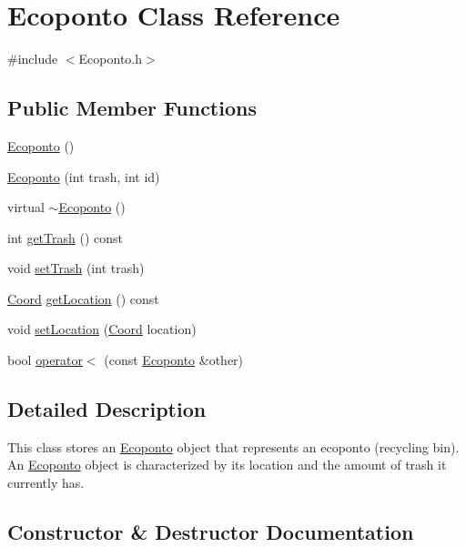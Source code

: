 \hypertarget{class_ecoponto}{}\section{Ecoponto Class Reference}
\label{class_ecoponto}


{\ttfamily \#include $<$Ecoponto.\+h$>$}

\subsection*{Public Member Functions}
\begin{DoxyCompactItemize}
\item 
\hyperlink{class_ecoponto_a77182257dfc416589972bd4207142f6b}{Ecoponto} ()
\item 
\hyperlink{class_ecoponto_aa22ed326556db71e993a171c420c4dc0}{Ecoponto} (int trash, int id)
\item 
virtual \hyperlink{class_ecoponto_ab55000fee9f2189ed648571d0760df87}{$\sim$\+Ecoponto} ()
\item 
int \hyperlink{class_ecoponto_a55135a0a993421f2b52379b86379dfe8}{get\+Trash} () const 
\item 
void \hyperlink{class_ecoponto_a6393c63f3bcd980e259c16c2a89b4b91}{set\+Trash} (int trash)
\item 
\hyperlink{class_coord}{Coord} \hyperlink{class_ecoponto_af3b7224cf4a372fbd8f82f3108c0bcf7}{get\+Location} () const 
\item 
void \hyperlink{class_ecoponto_a3d86e2d6ed7464996fc25e13ba1060cc}{set\+Location} (\hyperlink{class_coord}{Coord} location)
\item 
bool \hyperlink{class_ecoponto_a919084644d4ba9851a8be0c4bc2746c0}{operator$<$} (const \hyperlink{class_ecoponto}{Ecoponto} \&other)
\end{DoxyCompactItemize}


\subsection{Detailed Description}
This class stores an \hyperlink{class_ecoponto}{Ecoponto} object that represents an ecoponto (recycling bin). An \hyperlink{class_ecoponto}{Ecoponto} object is characterized by its location and the amount of trash it currently has. 

\subsection{Constructor \& Destructor Documentation}
